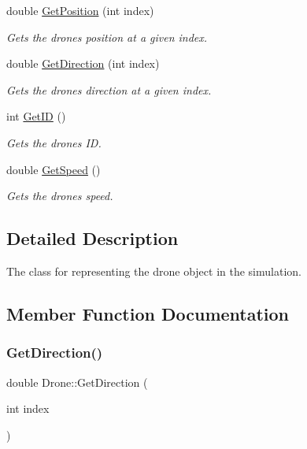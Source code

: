 \begin{DoxyCompactItemize}
double \hyperlink{classDrone_ad8e2a72eb608ef4f8a82402a74fd5ad5}{Get\+Position} (int index)
\begin{DoxyCompactList}\small\item\em Gets the drone\textquotesingle{}s position at a given index. \end{DoxyCompactList}\item 
double \hyperlink{classDrone_a3c240b2f2cb2a355f27e31dd3b5ac931}{Get\+Direction} (int index)
\begin{DoxyCompactList}\small\item\em Gets the drone\textquotesingle{}s direction at a given index. \end{DoxyCompactList}\item 
int \hyperlink{classDrone_a5e69f5ebe80ece53ccb2238a2b598d97}{Get\+ID} ()
\begin{DoxyCompactList}\small\item\em Gets the drone\textquotesingle{}s ID. \end{DoxyCompactList}\item 
double \hyperlink{classDrone_ac8c535643f2be526c0ac8b0cc1fc49fc}{Get\+Speed} ()
\begin{DoxyCompactList}\small\item\em Gets the drone\textquotesingle{}s speed. \end{DoxyCompactList}\end{DoxyCompactItemize}


\subsection{Detailed Description}
The class for representing the drone object in the simulation. 

\subsection{Member Function Documentation}
\mbox{\label{classDrone_a3c240b2f2cb2a355f27e31dd3b5ac931}} 
\subsubsection{\texorpdfstring{Get\+Direction()}{GetDirection()}}
{\footnotesize\ttfamily double Drone\+::\+Get\+Direction (\begin{DoxyParamCaption}\item[{int}]{index }\end{DoxyParamCaption})\hspace{0.3cm}{\ttfamily [inline]}}



